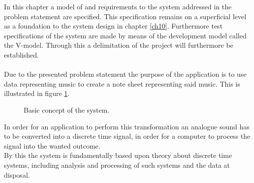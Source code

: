 In this chapter a model of and requirements to the system addressed in the problem statement are specified. This specification remains on a superficial level as a foundation to the system design in chapter \ref{ch10}. Furthermore test specifications of the system are made by means of the development model called the V-model. Through this a delimitation of the project will furthermore be established. \\   
\\
Due to the presented problem statement the purpose of the application is to use data representing music to create a note sheet representing said music. This is illustrated in figure \ref{fig:model1}.    
\begin{figure}[H]
\centering
{}
\caption{Basic concept of the system.}
\label{fig:model1}
\end{figure}
In order for an application to perform this transformation an analogue sound has to be converted into a discrete time signal, in order for a computer to process the signal into the wanted outcome. \\
By this the system is fundamentally based upon theory about discrete time systems, including analysis and processing of such systems and the data at disposal.

